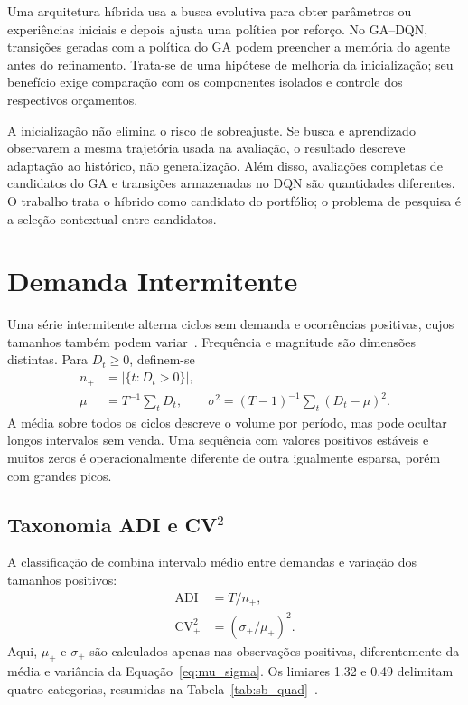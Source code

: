 Uma arquitetura híbrida usa a busca evolutiva para obter parâmetros ou experiências iniciais e depois ajusta uma política por reforço. No GA--DQN, transições geradas com a política do GA podem preencher a memória do agente antes do refinamento. Trata-se de uma hipótese de melhoria da inicialização; seu benefício exige comparação com os componentes isolados e controle dos respectivos orçamentos.



A inicialização não elimina o risco de sobreajuste. Se busca e aprendizado observarem a mesma trajetória usada na avaliação, o resultado descreve adaptação ao histórico, não generalização. Além disso, avaliações completas de candidatos do GA e transições armazenadas no DQN são quantidades diferentes. O trabalho trata o híbrido como candidato do portfólio; o problema de pesquisa é a seleção contextual entre candidatos.

\section{Demanda Intermitente}

Uma série intermitente alterna ciclos sem demanda e ocorrências positivas, cujos tamanhos também podem variar~\citep{Croston1972ForecastingIntermittentDemand,Boylan2008Intermittent}. Frequência e magnitude são dimensões distintas. Para $D_t\geq0$, definem-se
\begin{align}
n_+&=|\{t:D_t>0\}|,\label{eq:n_pos}\\
\mu&=T^{-1}\sum_tD_t,\qquad \sigma^2=(T-1)^{-1}\sum_t(D_t-\mu)^2.\label{eq:mu_sigma}
\end{align}
A média sobre todos os ciclos descreve o volume por período, mas pode ocultar longos intervalos sem venda. Uma sequência com valores positivos estáveis e muitos zeros é operacionalmente diferente de outra igualmente esparsa, porém com grandes picos.

\subsection[Taxonomia ADI e CV quadrado]{Taxonomia ADI e CV$^2$}
\label{sec:sb_taxa}

A classificação de \citet{Syntetos2005Categorization} combina intervalo médio entre demandas e variação dos tamanhos positivos:
\begin{align}
\mathrm{ADI}&=T/n_+,\label{eq:adi}\\
\mathrm{CV}_+^2&=(\sigma_+/\mu_+)^2.\label{eq:cv2}
\end{align}
Aqui, $\mu_+$ e $\sigma_+$ são calculados apenas nas observações positivas, diferentemente da média e variância da Equação~\ref{eq:mu_sigma}. Os limiares 1.32 e 0.49 delimitam quatro categorias, resumidas na Tabela~\ref{tab:sb_quad}~\citep{Syntetos2012DemandClassificationsApplications}.

